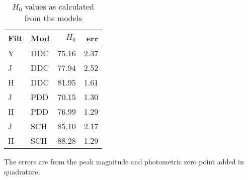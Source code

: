 \begin{table}
\begin{center}
\begin{minipage}{70mm}
\caption{$H_0$ values as calculated from the models}
\begin{tabular}{l|l|r|r}
\\
\hline
Filt	& 	Mod & $H_0$ & err \\
\hline
Y	& DDC	& 75.16 & 2.37	\\
J	& DDC	& 77.94	& 2.52\\
H	& DDC	& 81.95	& 1.61\\
J	& PDD	& 70.15 & 1.30	\\
H	& PDD	& 76.99 & 1.29	\\
J	& SCH	& 85.10	& 2.17	\\
H	& SCH	& 88.28	& 1.29	\\
\hline
\end{tabular}
\end{minipage}
\end{center}
\end{table}

The errors are from the peak magnitude and photometric zero point added in quadrature. 
